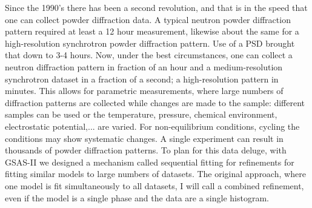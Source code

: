 Since the 1990's there has been a second revolution, and that is in the speed that one can collect powder diffraction data. A typical neutron powder diffraction pattern required at least a 12 hour measurement, likewise about the same for a high-resolution synchrotron powder diffraction pattern. Use of a PSD brought that down to 3-4 hours. Now, under the best circumstances, one can collect a neutron diffraction pattern in fraction of an hour and a medium-resolution synchrotron dataset in a fraction of a second; a high-resolution pattern in minutes. This allows for parametric measurements, where large numbers of diffraction patterns are collected while changes are made to the sample: different samples can be used or the temperature, pressure, chemical environment, electrostatic potential,... are varied. For non-equilibrium conditions, cycling the conditions may show systematic changes. A single experiment can result in thousands of powder diffraction patterns. To plan for this data deluge, with GSAS-II we designed a mechanism called sequential fitting for refinements for fitting similar models to large numbers of datasets. The original approach, where one model is fit simultaneously to all datasets, I will call a combined refinement, even if the model is a single phase and the data are a single histogram.

